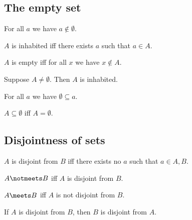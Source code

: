 \subsection{The empty set}

\begin{axiom}\label{emptyset}
    For all $a$ we have $a\notin\emptyset$.
\end{axiom}

\begin{abbreviation}\label{inhabited}
    $A$ is inhabited iff
    there exists $a$ such that $a\in A$.
\end{abbreviation}

\begin{abbreviation}\label{empty}
    $A$ is empty iff for all $x$ we have $x\notin A$.
\end{abbreviation}

\begin{proposition}\label{nonempty_inhabited}
    Suppose $A\neq\emptyset$. Then $A$ is inhabited.
\end{proposition}

\begin{proposition}\label{emptyset_subseteq}
    For all $a$ we have $\emptyset \subseteq a$.
\end{proposition}

\begin{proposition}%
\label{subseteq_emptyset_iff}
    $A\subseteq \emptyset$ iff $A = \emptyset$.
\end{proposition}


\subsection{Disjointness of sets}

\begin{definition}\label{disjoint}
    $A$ is disjoint from $B$ iff there exists no $a$ such that $a\in A, B$.
\end{definition}

\begin{abbreviation}\label{notmeets}
    $A\notmeets B$ iff $A$ is disjoint from $B$.
\end{abbreviation}

\begin{abbreviation}\label{meets}
    $A\meets B$ iff $A$ is not disjoint from $B$.
\end{abbreviation}

\begin{proposition}%
\label{disjoint_symmetric}
    If $A$ is disjoint from $B$, then $B$ is disjoint from $A$.
\end{proposition}





